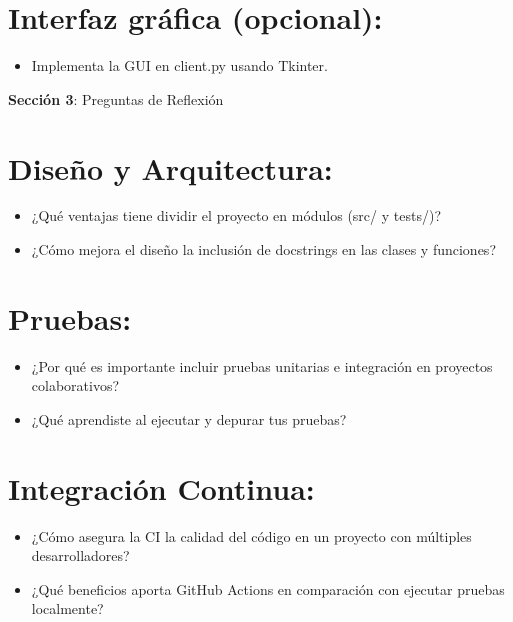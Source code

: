 \documentclass[
  a4paper,
  DIV=11,
  numbers=noendperiod,
  onepage,
  openany]{scrreprt}
\providecommand{\tightlist}{%
  \setlength{\itemsep}{0pt}\setlength{\parskip}{0pt}}\usepackage{longtable,booktabs,array}
\begin{document}
\section{Interfaz gráfica
(opcional):}\label{interfaz-gruxe1fica-opcional}

\begin{itemize}
\tightlist
\item
  Implementa la GUI en client.py usando Tkinter.
\end{itemize}

\textbf{Sección 3}: Preguntas de Reflexión

\section{Diseño y Arquitectura:}\label{diseuxf1o-y-arquitectura-1}

\begin{itemize}
\tightlist
\item
  ¿Qué ventajas tiene dividir el proyecto en módulos (src/ y tests/)?
\item
  ¿Cómo mejora el diseño la inclusión de docstrings en las clases y
  funciones?
\end{itemize}

\section{Pruebas:}\label{pruebas-5}

\begin{itemize}
\tightlist
\item
  ¿Por qué es importante incluir pruebas unitarias e integración en
  proyectos colaborativos?
\item
  ¿Qué aprendiste al ejecutar y depurar tus pruebas?
\end{itemize}

\section{Integración Continua:}\label{integraciuxf3n-continua-2}

\begin{itemize}
\tightlist
\item
  ¿Cómo asegura la CI la calidad del código en un proyecto con múltiples
  desarrolladores?
\item
  ¿Qué beneficios aporta GitHub Actions en comparación con ejecutar
  pruebas localmente?
\end{itemize}
\end{document}
